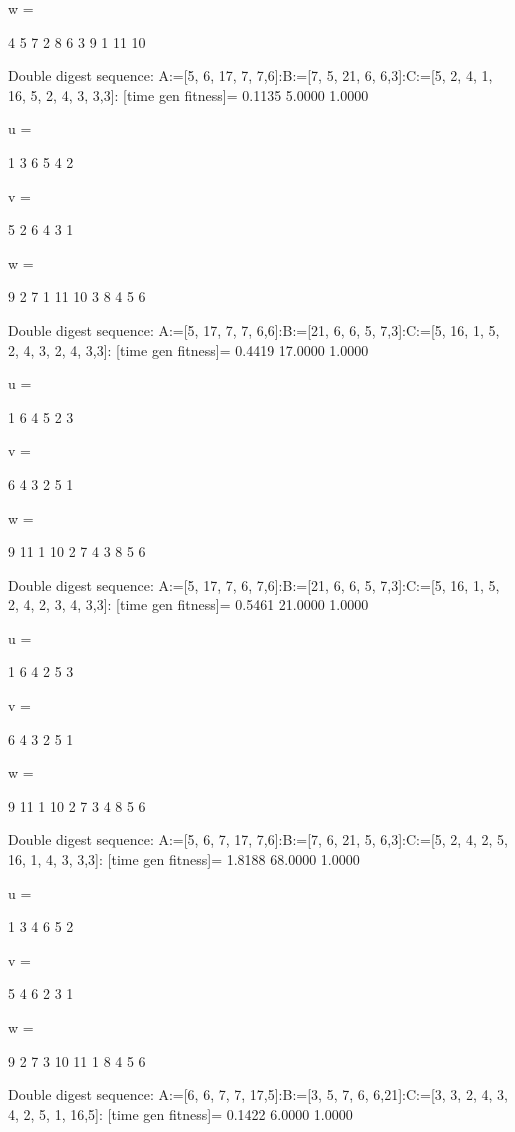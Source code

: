 w =

     4     5     7     2     8     6     3     9     1    11    10

Double digest sequence:
A:=[5, 6, 17, 7, 7,6]:B:=[7, 5, 21, 6, 6,3]:C:=[5, 2, 4, 1, 16, 5, 2, 4, 3, 3,3]:
[time gen fitness]=
    0.1135    5.0000    1.0000


u =

     1     3     6     5     4     2


v =

     5     2     6     4     3     1


w =

     9     2     7     1    11    10     3     8     4     5     6

Double digest sequence:
A:=[5, 17, 7, 7, 6,6]:B:=[21, 6, 6, 5, 7,3]:C:=[5, 16, 1, 5, 2, 4, 3, 2, 4, 3,3]:
[time gen fitness]=
    0.4419   17.0000    1.0000


u =

     1     6     4     5     2     3


v =

     6     4     3     2     5     1


w =

     9    11     1    10     2     7     4     3     8     5     6

Double digest sequence:
A:=[5, 17, 7, 6, 7,6]:B:=[21, 6, 6, 5, 7,3]:C:=[5, 16, 1, 5, 2, 4, 2, 3, 4, 3,3]:
[time gen fitness]=
    0.5461   21.0000    1.0000


u =

     1     6     4     2     5     3


v =

     6     4     3     2     5     1


w =

     9    11     1    10     2     7     3     4     8     5     6

Double digest sequence:
A:=[5, 6, 7, 17, 7,6]:B:=[7, 6, 21, 5, 6,3]:C:=[5, 2, 4, 2, 5, 16, 1, 4, 3, 3,3]:
[time gen fitness]=
    1.8188   68.0000    1.0000


u =

     1     3     4     6     5     2


v =

     5     4     6     2     3     1


w =

     9     2     7     3    10    11     1     8     4     5     6

Double digest sequence:
A:=[6, 6, 7, 7, 17,5]:B:=[3, 5, 7, 6, 6,21]:C:=[3, 3, 2, 4, 3, 4, 2, 5, 1, 16,5]:
[time gen fitness]=
    0.1422    6.0000    1.0000


